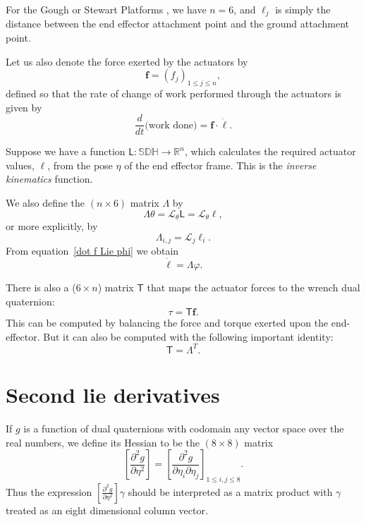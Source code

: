\documentclass[reqno,12pt]{amsart}
\newcommand\setunitdualquat{\mathbb S\mathbb D\mathbb H}
\newcommand{\liederiv}{\mathcal L}
\begin{document}
For the Gough or Stewart Platforms \cite{gallardo-alvarado}, we have $n = 6$, and $\ell_j$ is simply the distance between the end effector attachment point and the ground attachment point.

Let us also denote the force exerted by the actuators by 
\begin{equation}
\bm f = (f_j)_{1 \le j \le n} ,
\end{equation}
defined so that the rate of change of work performed through the actuators is given by
\begin{equation}
\label{dot h f ell}
\frac{d}{dt} \text{(work done)} = \bm f \cdot \dot{\bm\ell} .
\end{equation}

Suppose we have a function $\mathsf L : \setunitdualquat \to \mathbb R^n$, which calculates the required actuator values, $\bm \ell$, from the pose $\eta$ of the end effector frame.  This is the \emph{inverse kinematics} function.

We also define the $(n \times 6)$ matrix $\mathsf \Lambda$ by
\begin{equation}
\label{Lambda}
\mathsf \Lambda \theta = \liederiv_\theta \mathsf L = \liederiv_\theta \bm \ell ,
\end{equation}
or more explicitly, by
\begin{equation}
\mathsf \Lambda_{i,j} = \liederiv_j \mathsf \ell_i .
\end{equation}
From equation~\eqref{dot f Lie phi} we obtain
\begin{equation}
\label{dot l Lambda phi}
\dot{\bm \ell} = \mathsf \Lambda \varphi .
\end{equation}

There is also a ($6 \times n$) matrix $\mathsf T$ that maps the actuator forces to the wrench dual quaternion:
\begin{equation}
\label{T}
\tau = \mathsf T \bm f .
\end{equation}
This can be computed by balancing the force and torque exerted upon the end-effector.  But it can also be computed with the following important identity:
\begin{equation}
\label{T=L^T}
\mathsf T = \mathsf \Lambda^T.
\end{equation}

\section{Second lie derivatives}

If $g$ is a function of dual quaternions with codomain any vector space over the real numbers, we define its Hessian to be the $(8 \times 8)$ matrix
\begin{equation}
\left[\frac{\partial^2 g}{\partial \eta^2}\right] = \left[\frac{\partial^2 g}{\partial \eta_i\partial \eta_j}\right] _{ 1 \le i,j \le 8 }.
\end{equation}
Thus the expression $\left[\frac{\partial^2 g}{\partial \eta^2}\right] \gamma$ should be interpreted as a matrix product with $\gamma$ treated as an eight dimensional column vector.
\end{document}
